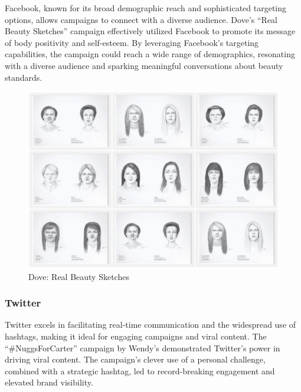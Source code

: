 \documentclass[
]{book}
\begin{document}
Facebook, known for its broad demographic reach and sophisticated targeting options, allows campaigns to connect with a diverse audience. Dove's ``Real Beauty Sketches'' campaign effectively utilized Facebook to promote its message of body positivity and self-esteem. By leveraging Facebook's targeting capabilities, the campaign could reach a wide range of demographics, resonating with a diverse audience and sparking meaningful conversations about beauty standards.

\begin{figure}
\centering
\includegraphics[width=1\textwidth,height=\textheight]{images/dove.jpg}
\caption{Dove: Real Beauty Sketches}
\end{figure}

\hypertarget{twitter}{%
\subsubsection*{Twitter}\label{twitter}}

Twitter excels in facilitating real-time communication and the widespread use of hashtags, making it ideal for engaging campaigns and viral content. The ``\#NuggsForCarter'' campaign by Wendy's demonstrated Twitter's power in driving viral content. The campaign's clever use of a personal challenge, combined with a strategic hashtag, led to record-breaking engagement and elevated brand visibility.
\end{document}
